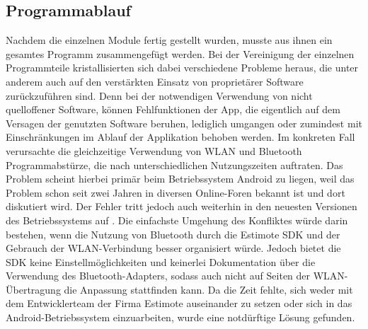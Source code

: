 \subsection{Programmablauf}
Nachdem die einzelnen Module fertig gestellt wurden, musste aus ihnen ein gesamtes Programm zusammengefügt werden. Bei der Vereinigung der einzelnen Programmteile kristallisierten sich dabei verschiedene Probleme heraus, die unter anderem auch auf den verstärkten Einsatz von proprietärer Software zurückzuführen sind. Denn bei der notwendigen Verwendung von nicht quelloffener Software, können Fehlfunktionen der App, die eigentlich auf dem Versagen der genutzten Software beruhen, lediglich umgangen oder zumindest mit Einschränkungen im Ablauf der Applikation behoben werden. Im konkreten Fall verursachte die gleichzeitige Verwendung von WLAN und Bluetooth Programmabstürze, die nach unterschiedlichen Nutzungszeiten auftraten. Das Problem scheint hierbei primär beim Betriebssystem Android zu liegen, weil das Problem schon seit zwei Jahren in diversen Online-Foren bekannt ist und dort diskutiert wird. Der Fehler tritt jedoch auch weiterhin in den neuesten Versionen des Betriebssystems auf \cite{AndWLBT}. Die einfachste Umgehung des Konfliktes würde darin bestehen, wenn die Nutzung von Bluetooth durch die Estimote SDK und der Gebrauch der WLAN-Verbindung besser organisiert würde. Jedoch bietet die SDK keine Einstellmöglichkeiten und keinerlei Dokumentation über die Verwendung des Bluetooth-Adapters, sodass auch nicht auf Seiten der WLAN-Übertragung die Anpassung stattfinden kann. Da die Zeit fehlte, sich weder mit dem Entwicklerteam der Firma Estimote auseinander zu setzen oder sich in das Android-Betriebssystem einzuarbeiten, wurde eine notdürftige Lösung gefunden. \\ \\
